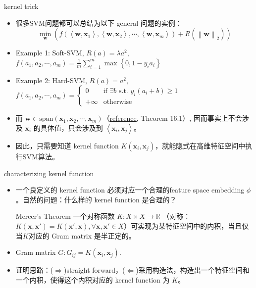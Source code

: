 \begin{frame}[fragile]{kernel trick}
    \begin{itemize}
        \item 很多SVM问题都可以总结为以下 general 问题的实例：
        \[
           \min_{\mathbf{w}} \left( f(\left\langle \mathbf{w}, \mathbf{x}_1 \right\rangle, \left\langle \mathbf{w}, \mathbf{x}_2 \right\rangle, \cdots, \left\langle \mathbf{w}, \mathbf{x}_m \right\rangle ) + R(\left\| \mathbf{w} \right\|_2 )\right) 
        \]
        \item Example 1: Soft-SVM, $R(a) = \lambda a^{2}$, $f(a_1, a_2, \cdots, a_m) = \frac{1}{m} \sum_{i=1}^{m}\max \left\{ 0, 1-y_i a_i \right\} $
        \item Example 2: Hard-SVM, $R(a) = a^{2}$, $f(a_1, a_2, \cdots, a_m) = \begin{cases} 0 & \text{if } \exists  b \text{ s.t. } y_i (a_i+b) \geqslant 1 \\ +\infty & \text{otherwise} \end{cases} $
        \item 而 $\mathbf{w} \in \text{span}(\mathbf{x}_1, \mathbf{x}_2, \cdots, \mathbf{x}_m)$（\href{https://www.cs.huji.ac.il/w~shais/UnderstandingMachineLearning/understanding-machine-learning-theory-algorithms.pdf}{\underline{reference}}, Theorem 16.1）, 因而事实上不会涉及 $\mathbf{x}_i$ 的具体值，只会涉及到 $\left\langle \mathbf{x}_i, \mathbf{x}_j \right\rangle$。
        \item 因此，只需要知道 kernel function $K(\mathbf{x}_i, \mathbf{x}_j)$，就能隐式在高维特征空间中执行SVM算法。
    \end{itemize}
\end{frame}

\begin{frame}[fragile]{characterizing kernel function}
    \begin{itemize}
        \item 一个良定义的 kernel function 必须对应一个合理的feature space embedding $\phi$。自然的问题：什么样的 kernel function 是合理的？
        \begin{block}{Mercer's Theorem}
            一个对称函数 $K:X\times X \to \mathbb{R}$ （对称：$K(\mathbf{x}, \mathbf{x'}) = K(\mathbf{x'}, \mathbf{x}), \forall \mathbf{x}, \mathbf{x'} \in X$）可实现为某特征空间中的内积，当且仅当$K$对应的 Gram matrix 是半正定的。
        \end{block}
        \item Gram matrix $G: G_{ij} = K(\mathbf{x}_i, \mathbf{x}_j)$.
        \item 证明思路：($\Rightarrow $)straight forward，($\Leftarrow $)采用构造法，构造出一个特征空间和一个内积，使得这个内积对应的 kernel function 为 $K$。
    \end{itemize}

\end{frame}
